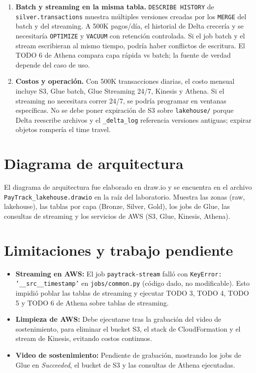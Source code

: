 ﻿\documentclass[11pt,a4paper]{article}
\begin{document}
\begin{enumerate}[label=Q\arabic*., leftmargin=*, start=7]
  \item \textbf{Batch y streaming en la misma tabla.} \texttt{DESCRIBE HISTORY} de \texttt{silver.transactions} muestra múltiples versiones creadas por los \texttt{MERGE} del batch y del streaming. A 500K pagos/día, el historial de Delta crecería y se necesitaría \texttt{OPTIMIZE} y \texttt{VACUUM} con retención controlada. Si el job batch y el stream escribieran al mismo tiempo, podría haber conflictos de escritura. El TODO 6 de Athena compara capa rápida vs batch; la fuente de verdad depende del caso de uso.
  
  \item \textbf{Costos y operación.} Con 500K transacciones diarias, el costo mensual incluye S3, Glue batch, Glue Streaming 24/7, Kinesis y Athena. Si el streaming no necesitara correr 24/7, se podría programar en ventanas específicas. No se debe poner expiración de S3 sobre \texttt{lakehouse/} porque Delta reescribe archivos y el \texttt{\_delta\_log} referencia versiones antiguas; expirar objetos rompería el time travel.
\end{enumerate}

\section{Diagrama de arquitectura}

El diagrama de arquitectura fue elaborado en draw.io y se encuentra en el archivo \texttt{PayTrack\_lakehouse.drawio} en la raíz del laboratorio. Muestra las zonas (raw, lakehouse), las tablas por capa (Bronze, Silver, Gold), los jobs de Glue, las consultas de streaming y los servicios de AWS (S3, Glue, Kinesis, Athena).

\section{Limitaciones y trabajo pendiente}

\begin{itemize}
  \item \textbf{Streaming en AWS:} El job \texttt{paytrack-stream} falló con \texttt{KeyError: '\_\_src\_\_timestamp'} en \texttt{jobs/common.py} (código dado, no modificable). Esto impidió poblar las tablas de streaming y ejecutar TODO 3, TODO 4, TODO 5 y TODO 6 de Athena sobre tablas de streaming.
  \item \textbf{Limpieza de AWS:} Debe ejecutarse tras la grabación del video de sostenimiento, para eliminar el bucket S3, el stack de CloudFormation y el stream de Kinesis, evitando costos continuos.
  \item \textbf{Video de sostenimiento:} Pendiente de grabación, mostrando los jobs de Glue en \emph{Succeeded}, el bucket de S3 y las consultas de Athena ejecutadas.
\end{itemize}
\end{document}
